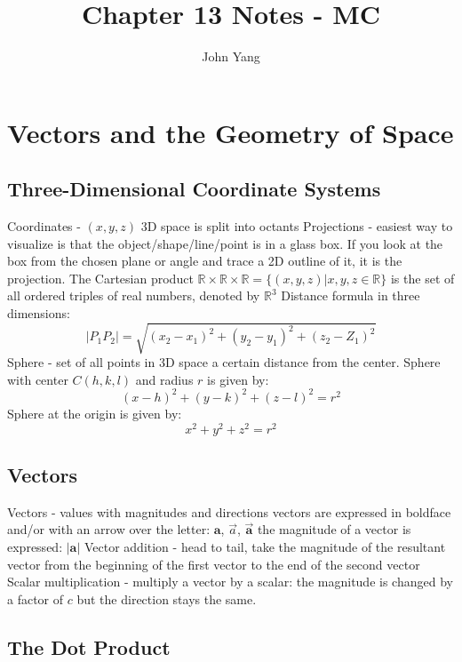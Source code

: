 \documentclass{article}
\title{Chapter 13 Notes - MC} %
\author{John Yang}
\begin{document}
    \maketitle
    \tableofcontents
    \section{Vectors and the Geometry of Space} %
    \subsection{Three-Dimensional Coordinate Systems} %
    \begin{outline}
        \1 Coordinates - \((x,y,z)\)
        \1 3D space is split into octants
        \1 Projections - easiest way to visualize is that the object/shape/line/point is in a glass box. If you look at the box from the chosen plane or angle and trace a 2D outline of it, it is the projection. 
        \1 The Cartesian product \(\mathbb{R}\times\mathbb{R}\times\mathbb{R}=\{(x,y,z)|x,y,z\in\mathbb{R}\}\) is the set of all ordered triples of real numbers, denoted by \(\mathbb{R}^3\)
        \1 Distance formula in three dimensions: \[|P_1P_2|=\sqrt{(x_2-x_1)^2+(y_2-y_1)^2+(z_2-Z_1)^2}\]
        \1 Sphere - set of all points in 3D space a certain distance from the center. 
            \2 Sphere with center \(C(h,k,l)\) and radius $r$ is given by: \[(x-h)^2+(y-k)^2+(z-l)^2=r^2\]
            \2 Sphere at the origin is given by: \[x^2+y^2+z^2=r^2\]
        
    \end{outline}
    \subsection{Vectors}
    \begin{outline}
        \1 Vectors - values with magnitudes and directions
        \1 vectors are expressed in boldface and/or with an arrow over the letter: \(\mathbf{a}\), \(\vec{a}\), \(\vec{\mathbf{a}}\)
        \1 the magnitude of a vector is expressed: \(|\mathbf{a}|\)
        \1 Vector addition - head to tail, take the magnitude of the resultant vector from the beginning of the first vector to the end of the second vector 
        \1 Scalar multiplication - multiply a vector by a scalar: the magnitude is changed by a factor of $c$ but the direction stays the same. 

    \end{outline}
    \subsection{The Dot Product}
    \begin{outline}
        \1 
    \end{outline} 
\end{document}
